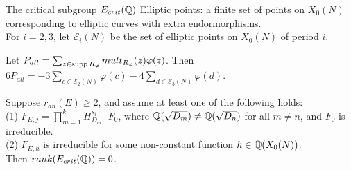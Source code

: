 \documentclass[handout]{beamer}
\begin{document}
\begin{frame}{The critical subgroup $E_{crit}(\mathbb{Q})$}
Elliptic points: a finite set of points on $X_0(N)$ corresponding to elliptic curves with extra endormorphisms. \\ 

For $i = 2,3$, let $\mathscr{E}_i(N)$ be the set of elliptic points on $X_0(N)$ of period $i$.  \\ 

\pause

\begin{Lemma}[C.]
Let $P_{all} = \sum_{z \in \operatorname{supp} R_\varphi} mult_{R_\varphi}(z) \varphi(z)$.  Then \\
$6 P_{all} =  - 3 \sum_{c \in \mathscr{E}_2(N)} \varphi(c) - 4 \sum_{d \in \mathscr{E}_3(N)} \varphi(d)$. \\
\end{Lemma}

\smallskip
\pause




\begin{Theorem}[C.]
\label{cor: cm}
Suppose $r_{an}(E) \geq 2$, and assume at least one of the following holds: \\
(1) $F_{E,j} = \prod_{m =1}^k H_{D_m}^{s_i}\cdot F_0$, where 
$\mathbb{Q}(\sqrt{D_m}) \neq \mathbb{Q}(\sqrt{D_n})$ for all $m\neq n$, and $F_0$ is irreducible. \\
(2) $F_{E,h}$ is irreducible for some non-constant function $h \in \mathbb{Q}(X_0(N))$. \\
Then $rank(E_{crit}(\mathbb{Q}))  = 0$. 
\end{Theorem}
\end{frame}


\end{document}
